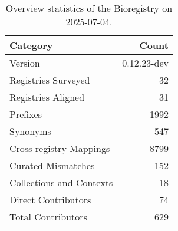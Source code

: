 \begin{table}
\caption{Overview statistics of the Bioregistry on 2025-07-04.}
\label{tab:bioregistry-summary}
\begin{tabular}{lr}
\toprule
Category & Count \\
\midrule
Version & 0.12.23-dev \\
Registries Surveyed & 32 \\
Registries Aligned & 31 \\
Prefixes & 1992 \\
Synonyms & 547 \\
Cross-registry Mappings & 8799 \\
Curated Mismatches & 152 \\
Collections and Contexts & 18 \\
Direct Contributors & 74 \\
Total Contributors & 629 \\
\bottomrule
\end{tabular}
\end{table}
